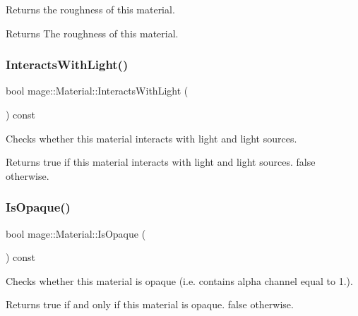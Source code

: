 Returns the roughness of this material.

\begin{DoxyReturn}{Returns}
The roughness of this material. 
\end{DoxyReturn}
\hypertarget{structmage_1_1_material_a9bb48fe0f9f8d2c21073bdf650957bd6}{}\label{structmage_1_1_material_a9bb48fe0f9f8d2c21073bdf650957bd6} 
\subsubsection{\texorpdfstring{Interacts\+With\+Light()}{InteractsWithLight()}}
{\footnotesize\ttfamily bool mage\+::\+Material\+::\+Interacts\+With\+Light (\begin{DoxyParamCaption}{ }\end{DoxyParamCaption}) const\hspace{0.3cm}{\ttfamily [noexcept]}}

Checks whether this material interacts with light and light sources.

\begin{DoxyReturn}{Returns}
{\ttfamily true} if this material interacts with light and light sources. {\ttfamily false} otherwise. 
\end{DoxyReturn}
\hypertarget{structmage_1_1_material_a0df1804c29bfd9d2bbc606d6285dccec}{}\label{structmage_1_1_material_a0df1804c29bfd9d2bbc606d6285dccec} 
\subsubsection{\texorpdfstring{Is\+Opaque()}{IsOpaque()}}
{\footnotesize\ttfamily bool mage\+::\+Material\+::\+Is\+Opaque (\begin{DoxyParamCaption}{ }\end{DoxyParamCaption}) const\hspace{0.3cm}{\ttfamily [noexcept]}}

Checks whether this material is opaque (i.\+e. contains alpha channel equal to 1.).

\begin{DoxyReturn}{Returns}
{\ttfamily true} if and only if this material is opaque. {\ttfamily false} otherwise. 
\end{DoxyReturn}
\hypertarget{structmage_1_1_material_a6a62e3889887e77259070e1f9cd9150f}{}\label{structmage_1_1_material_a6a62e3889887e77259070e1f9cd9150f} 
